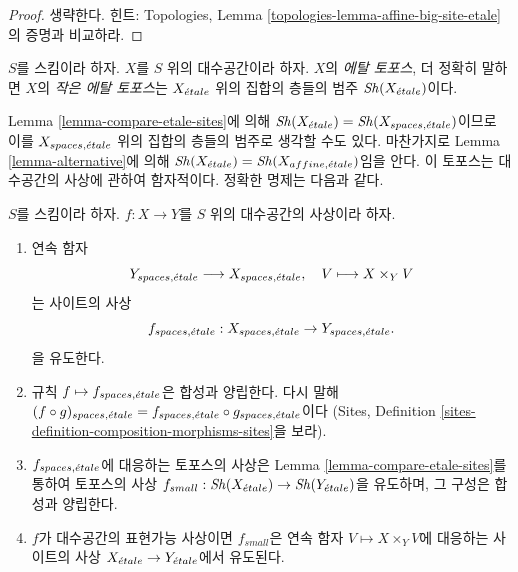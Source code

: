 \begin{proof}
생략한다. 힌트: Topologies, Lemma
\ref{topologies-lemma-affine-big-site-etale}의 증명과 비교하라.
\end{proof}

\begin{definition}
\label{definition-etale-topos}
$S$를 스킴이라 하자. $X$를 $S$ 위의 대수공간이라 하자.
$X$의 {\it 에탈 토포스}, 더 정확히 말하면
$X$의 {\it 작은 에탈 토포스}는 $X_{\acute{e}tale}$ 위의 집합의 층들의 범주
$\mathop{\mathit{Sh}}\nolimits(X_{\acute{e}tale})$이다.
\end{definition}

\noindent
Lemma \ref{lemma-compare-etale-sites}에 의해
$\mathop{\mathit{Sh}}\nolimits(X_{\acute{e}tale}) = \mathop{\mathit{Sh}}\nolimits(X_{spaces, {\acute{e}tale}})$이므로 이를
$X_{spaces, {\acute{e}tale}}$ 위의 집합의 층들의 범주로 생각할 수도 있다.
마찬가지로 Lemma \ref{lemma-alternative}에 의해
$\mathop{\mathit{Sh}}\nolimits(X_{\acute{e}tale}) = \mathop{\mathit{Sh}}\nolimits(X_{affine, {\acute{e}tale}})$임을 안다.
이 토포스는 대수공간의 사상에 관하여 함자적이다.
정확한 명제는 다음과 같다.

\begin{lemma}
\label{lemma-functoriality-etale-site}
$S$를 스킴이라 하자.
$f : X \to Y$를 $S$ 위의 대수공간의 사상이라 하자.
\begin{enumerate}
\item 연속 함자
$$
Y_{spaces, {\acute{e}tale}} \longrightarrow X_{spaces, {\acute{e}tale}}, \quad
V \longmapsto X \times_Y V
$$
는 사이트의 사상
$$
f_{spaces, {\acute{e}tale}} :
X_{spaces, {\acute{e}tale}}
\to
Y_{spaces, {\acute{e}tale}}.
$$
을 유도한다.
\item 규칙 $f \mapsto f_{spaces, {\acute{e}tale}}$은 합성과 양립한다.
다시 말해 $(f \circ g)_{spaces, {\acute{e}tale}}
= f_{spaces, {\acute{e}tale}} \circ g_{spaces, {\acute{e}tale}}$이다
(Sites, Definition \ref{sites-definition-composition-morphisms-sites}을
보라).
\item $f_{spaces, {\acute{e}tale}}$에 대응하는 토포스의 사상은
Lemma \ref{lemma-compare-etale-sites}를 통하여 토포스의 사상
$f_{small} : \mathop{\mathit{Sh}}\nolimits(X_{\acute{e}tale}) \to \mathop{\mathit{Sh}}\nolimits(Y_{\acute{e}tale})$을 유도하며,
그 구성은 합성과 양립한다.
\item $f$가 대수공간의 표현가능 사상이면 $f_{small}$은
연속 함자 $V \mapsto X \times_Y V$에 대응하는
사이트의 사상 $X_{\acute{e}tale} \to Y_{\acute{e}tale}$에서 유도된다.
\end{enumerate}
\end{lemma}

